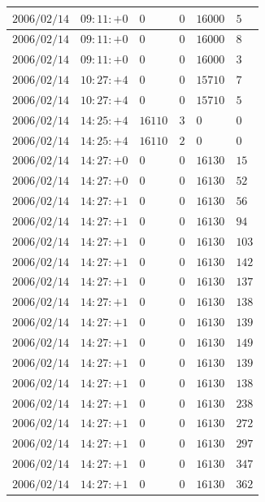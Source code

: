 \documentclass[a4j,papersize,disablejfam,slide,14pt]{jsarticle}
\begin{document}
\begin{description}
\begin{center}
\begin{longtable}{|l|l|l|l|l|l|}
					$2006/02/14$ & $09:11:+0$  & $0$ & $0$ & $16000$ & $5$ \\ \hline
					$2006/02/14$ & $09:11:+0$  & $0$ & $0$ & $16000$ & $8$ \\ \hline
					$2006/02/14$ & $09:11:+0$  & $0$ & $0$ & $16000$ & $3$ \\ \hline
					$2006/02/14$ & $10:27:+4$  & $0$ & $0$ & $15710$ & $7$ \\ \hline
					$2006/02/14$ & $10:27:+4$  & $0$ & $0$ & $15710$ & $5$ \\ \hline
					$2006/02/14$ & $14:25:+4$  & $16110$ & $3$ & $0$ & $0$ \\ \hline
					$2006/02/14$ & $14:25:+4$  & $16110$ & $2$ & $0$ & $0$ \\ \hline
					$2006/02/14$ & $14:27:+0$  & $0$ & $0$ & $16130$ & $15$ \\ \hline
					$2006/02/14$ & $14:27:+0$  & $0$ & $0$ & $16130$ & $52$ \\ \hline
					$2006/02/14$ & $14:27:+1$  & $0$ & $0$ & $16130$ & $56$ \\ \hline
					$2006/02/14$ & $14:27:+1$  & $0$ & $0$ & $16130$ & $94$ \\ \hline
					$2006/02/14$ & $14:27:+1$  & $0$ & $0$ & $16130$ & $103$ \\ \hline
					$2006/02/14$ & $14:27:+1$  & $0$ & $0$ & $16130$ & $142$ \\ \hline
					$2006/02/14$ & $14:27:+1$  & $0$ & $0$ & $16130$ & $137$ \\ \hline
					$2006/02/14$ & $14:27:+1$  & $0$ & $0$ & $16130$ & $138$ \\ \hline
					$2006/02/14$ & $14:27:+1$  & $0$ & $0$ & $16130$ & $139$ \\ \hline
					$2006/02/14$ & $14:27:+1$  & $0$ & $0$ & $16130$ & $149$ \\ \hline
					$2006/02/14$ & $14:27:+1$  & $0$ & $0$ & $16130$ & $139$ \\ \hline
					$2006/02/14$ & $14:27:+1$  & $0$ & $0$ & $16130$ & $138$ \\ \hline
					$2006/02/14$ & $14:27:+1$  & $0$ & $0$ & $16130$ & $238$ \\ \hline
					$2006/02/14$ & $14:27:+1$  & $0$ & $0$ & $16130$ & $272$ \\ \hline
					$2006/02/14$ & $14:27:+1$  & $0$ & $0$ & $16130$ & $297$ \\ \hline
					$2006/02/14$ & $14:27:+1$  & $0$ & $0$ & $16130$ & $347$ \\ \hline
					$2006/02/14$ & $14:27:+1$  & $0$ & $0$ & $16130$ & $362$ \\ \hline

\end{longtable}
\end{center}
\end{description}
\end{document}
